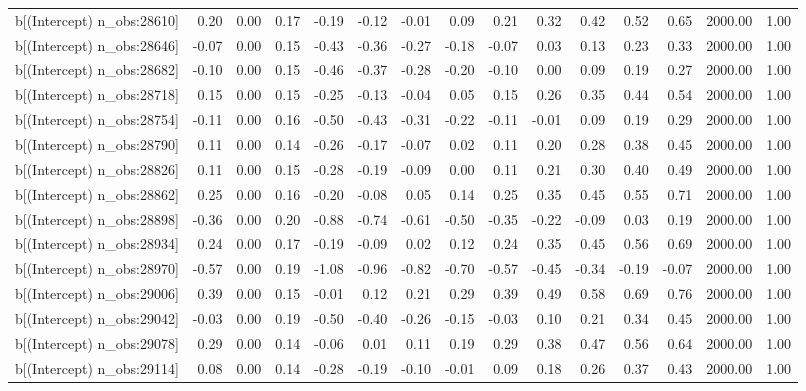 \begin{table}[ht]
\begin{tabular}{rrrrrrrrrrrrrrr}
  b[(Intercept) n\_obs:28610] & 0.20 & 0.00 & 0.17 & -0.19 & -0.12 & -0.01 & 0.09 & 0.21 & 0.32 & 0.42 & 0.52 & 0.65 & 2000.00 & 1.00 \\ 
  b[(Intercept) n\_obs:28646] & -0.07 & 0.00 & 0.15 & -0.43 & -0.36 & -0.27 & -0.18 & -0.07 & 0.03 & 0.13 & 0.23 & 0.33 & 2000.00 & 1.00 \\ 
  b[(Intercept) n\_obs:28682] & -0.10 & 0.00 & 0.15 & -0.46 & -0.37 & -0.28 & -0.20 & -0.10 & 0.00 & 0.09 & 0.19 & 0.27 & 2000.00 & 1.00 \\ 
  b[(Intercept) n\_obs:28718] & 0.15 & 0.00 & 0.15 & -0.25 & -0.13 & -0.04 & 0.05 & 0.15 & 0.26 & 0.35 & 0.44 & 0.54 & 2000.00 & 1.00 \\ 
  b[(Intercept) n\_obs:28754] & -0.11 & 0.00 & 0.16 & -0.50 & -0.43 & -0.31 & -0.22 & -0.11 & -0.01 & 0.09 & 0.19 & 0.29 & 2000.00 & 1.00 \\ 
  b[(Intercept) n\_obs:28790] & 0.11 & 0.00 & 0.14 & -0.26 & -0.17 & -0.07 & 0.02 & 0.11 & 0.20 & 0.28 & 0.38 & 0.45 & 2000.00 & 1.00 \\ 
  b[(Intercept) n\_obs:28826] & 0.11 & 0.00 & 0.15 & -0.28 & -0.19 & -0.09 & 0.00 & 0.11 & 0.21 & 0.30 & 0.40 & 0.49 & 2000.00 & 1.00 \\ 
  b[(Intercept) n\_obs:28862] & 0.25 & 0.00 & 0.16 & -0.20 & -0.08 & 0.05 & 0.14 & 0.25 & 0.35 & 0.45 & 0.55 & 0.71 & 2000.00 & 1.00 \\ 
  b[(Intercept) n\_obs:28898] & -0.36 & 0.00 & 0.20 & -0.88 & -0.74 & -0.61 & -0.50 & -0.35 & -0.22 & -0.09 & 0.03 & 0.19 & 2000.00 & 1.00 \\ 
  b[(Intercept) n\_obs:28934] & 0.24 & 0.00 & 0.17 & -0.19 & -0.09 & 0.02 & 0.12 & 0.24 & 0.35 & 0.45 & 0.56 & 0.69 & 2000.00 & 1.00 \\ 
  b[(Intercept) n\_obs:28970] & -0.57 & 0.00 & 0.19 & -1.08 & -0.96 & -0.82 & -0.70 & -0.57 & -0.45 & -0.34 & -0.19 & -0.07 & 2000.00 & 1.00 \\ 
  b[(Intercept) n\_obs:29006] & 0.39 & 0.00 & 0.15 & -0.01 & 0.12 & 0.21 & 0.29 & 0.39 & 0.49 & 0.58 & 0.69 & 0.76 & 2000.00 & 1.00 \\ 
  b[(Intercept) n\_obs:29042] & -0.03 & 0.00 & 0.19 & -0.50 & -0.40 & -0.26 & -0.15 & -0.03 & 0.10 & 0.21 & 0.34 & 0.45 & 2000.00 & 1.00 \\ 
  b[(Intercept) n\_obs:29078] & 0.29 & 0.00 & 0.14 & -0.06 & 0.01 & 0.11 & 0.19 & 0.29 & 0.38 & 0.47 & 0.56 & 0.64 & 2000.00 & 1.00 \\ 
  b[(Intercept) n\_obs:29114] & 0.08 & 0.00 & 0.14 & -0.28 & -0.19 & -0.10 & -0.01 & 0.09 & 0.18 & 0.26 & 0.37 & 0.43 & 2000.00 & 1.00 \\ 

\end{tabular}
\end{table}
